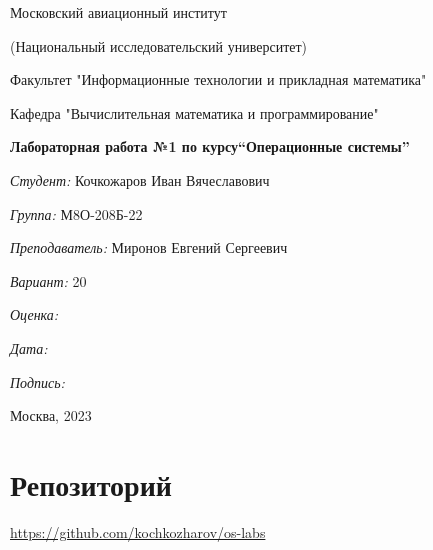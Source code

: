\documentclass[a4paper, 12pt]{article}
\begin{document}
\thispagestyle{empty}	
\begin{center}
	Московский авиационный институт
	
	(Национальный исследовательский университет)
	
	Факультет "Информационные технологии и прикладная математика"
	
	Кафедра "Вычислительная математика и программирование"
	
\end{center}
\vspace{40ex}
\begin{center}
	\textbf{\large{Лабораторная работа №1 по курсу\linebreak \textquotedblleft Операционные системы\textquotedblright}}
\end{center}
\vspace{35ex}
\begin{flushright}
	\textit{Студент: } Кочкожаров Иван Вячеславович
	
	\vspace{2ex}
	\textit{Группа: } М8О-208Б-22
	
	\vspace{2ex}
	\textit{Преподаватель: } Миронов Евгений Сергеевич
	
	\vspace{2ex}
	\textit{Вариант: } 20 
	
	\vspace{2ex}
	\textit{Оценка: } \underline{\quad\quad\quad\quad\quad\quad}
	
	 \vspace{2ex}
	\textit{Дата: } \underline{\quad\quad\quad\quad\quad\quad}
	
	\vspace{2ex}
	\textit{Подпись: } \underline{\quad\quad\quad\quad\quad\quad}
	
\end{flushright}

\vspace{5ex}

\begin{vfill}
	\begin{center}
		Москва, 2023
	\end{center}	
\end{vfill}
\newpage


\begingroup
\color{black}
\tableofcontents\newpage
\endgroup

\section{Репозиторий}
\href{https://github.com/kochkozharov/os-labs}{https://github.com/kochkozharov/os-labs}
\end{document}
